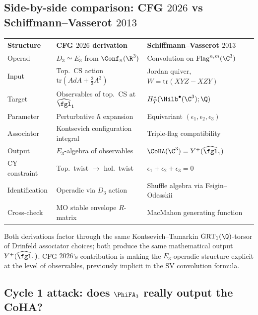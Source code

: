 \subsection*{Side-by-side comparison: CFG $2026$ vs Schiffmann--Vasserot $2013$}

\begin{remark}
\label{rem:side-by-side-derivations-wave10}
\begin{center}
\begin{tabular}{l|l|l}
\textbf{Structure} & \textbf{CFG $2026$ derivation} & \textbf{Schiffmann--Vasserot $2013$} \\
\hline
Operad & $D_3 \simeq E_3$ from $\Conf_n(\R^3)$ & Convolution on $\mathrm{Flag}^{n, m}(\C^3)$ \\
Input & Top.\ CS action $\mathrm{tr}(A dA + \tfrac{2}{3} A^3)$ & Jordan quiver, $W = \mathrm{tr}(XYZ - XZY)$ \\
Target & Observables of top.\ CS at $\widehat{\fgl}_1$ & $H^*_T(\Hilb^\bullet(\C^3); \Q)$ \\
Parameter & Perturbative $\hbar$ expansion & Equivariant $(\epsilon_1, \epsilon_2, \epsilon_3)$ \\
Associator & Kontsevich configuration integral & Triple-flag compatibility \\
Output & $E_3$-algebra of observables & $\CoHA(\C^3) = Y^+(\widehat{\fgl}_1)$ \\
CY constraint & Top.\ twist $\to$ hol.\ twist & $\epsilon_1 + \epsilon_2 + \epsilon_3 = 0$ \\
Identification & Operadic via $D_3$ action & Shuffle algebra via Feigin--Odesskii \\
Cross-check & MO stable envelope $R$-matrix & MacMahon generating function \\
\hline
\end{tabular}
\end{center}
Both derivations factor through the same Kontsevich--Tamarkin
$\mathrm{GRT}_1(\Q)$-torsor of Drinfeld associator choices; both produce
the same mathematical output $Y^+(\widehat{\fgl}_1)$. CFG $2026$'s
contribution is making the $E_3$-operadic structure explicit at the
level of observables, previously implicit in the SV convolution
formula.
\end{remark}

\subsection*{Cycle 1 attack: does $\PhiFA_3$ really output the CoHA?}

